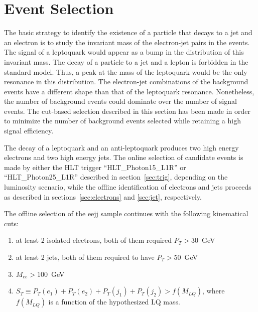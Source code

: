 %

\section{Event Selection} \label{sec:eventSelection}


The basic strategy to identify the existence of a particle that decays to a jet and an electron 
is to study the invariant mass of the electron-jet pairs in the events. 
The signal of a leptoquark would appear as a bump in the distribution of this invariant mass.
The decay of a particle to a jet and a lepton is forbidden in the standard model.  
Thus, a peak at the mass of the leptoquark would be the only resonance in this distribution. 
The electron-jet combinations of the background events have a different shape than that 
of the leptoquark resonance. 
Nonetheless, the number of background events could dominate over the number of signal events.  
The cut-based selection described in this section has been made in order to minimize the number 
of background events selected while retaining a high signal efficiency.

The decay of a leptoquark and an anti-leptoquark produces two high energy electrons and 
two high energy jets.
The online selection of candidate events is made by either the HLT trigger ``HLT\_Photon15\_L1R'' 
or ``HLT\_Photon25\_L1R'' described in section~\ref{sec:trig}, depending on the luminosity scenario, 
while the offline identification of electrons and jets 
proceeds as described in sections~\ref{sec:electrons} and \ref{sec:jet}, respectively.


The offline selection of the eejj sample continues with the following kinematical cuts:
%
\begin{enumerate}
\item at least 2 isolated electrons, both of them required $P_T>30$~GeV 
\item at least 2 jets, both of them required to have $P_T>50$~GeV
\item $M_{ee}>100$~GeV
\item $S_T\equiv P_T(e_1)+P_T(e_2)+P_T(j_1)+P_T(j_2)>f(M_{LQ})$, where $f(M_{LQ})$ is a function 
of the hypothesized LQ mass.
\end{enumerate}
%

